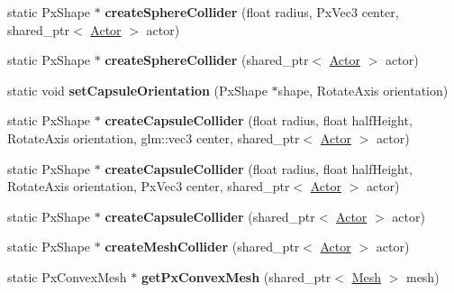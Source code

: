 \begin{DoxyCompactItemize}
\item 
\hypertarget{class_physics_a54b03c18d6a9cef0934ed0e5ba4d1664}{}static Px\+Shape $\ast$ {\bfseries create\+Sphere\+Collider} (float radius, Px\+Vec3 center, shared\+\_\+ptr$<$ \hyperlink{class_actor}{Actor} $>$ actor)\label{class_physics_a54b03c18d6a9cef0934ed0e5ba4d1664}

\item 
\hypertarget{class_physics_a62ed5a7e6561543d40284b1316c9e6f1}{}static Px\+Shape $\ast$ {\bfseries create\+Sphere\+Collider} (shared\+\_\+ptr$<$ \hyperlink{class_actor}{Actor} $>$ actor)\label{class_physics_a62ed5a7e6561543d40284b1316c9e6f1}

\item 
\hypertarget{class_physics_ae1f6e27ae24c88616eac4199329c2474}{}static void {\bfseries set\+Capsule\+Orientation} (Px\+Shape $\ast$shape, Rotate\+Axis orientation)\label{class_physics_ae1f6e27ae24c88616eac4199329c2474}

\item 
\hypertarget{class_physics_af667feaa16f54d7ba980b0535efdd725}{}static Px\+Shape $\ast$ {\bfseries create\+Capsule\+Collider} (float radius, float half\+Height, Rotate\+Axis orientation, glm\+::vec3 center, shared\+\_\+ptr$<$ \hyperlink{class_actor}{Actor} $>$ actor)\label{class_physics_af667feaa16f54d7ba980b0535efdd725}

\item 
\hypertarget{class_physics_ad61bf2c7fdb5b7f6263cb45801d80fa2}{}static Px\+Shape $\ast$ {\bfseries create\+Capsule\+Collider} (float radius, float half\+Height, Rotate\+Axis orientation, Px\+Vec3 center, shared\+\_\+ptr$<$ \hyperlink{class_actor}{Actor} $>$ actor)\label{class_physics_ad61bf2c7fdb5b7f6263cb45801d80fa2}

\item 
\hypertarget{class_physics_ab0918271779efbfbba18a39f7ee9e88a}{}static Px\+Shape $\ast$ {\bfseries create\+Capsule\+Collider} (shared\+\_\+ptr$<$ \hyperlink{class_actor}{Actor} $>$ actor)\label{class_physics_ab0918271779efbfbba18a39f7ee9e88a}

\item 
\hypertarget{class_physics_a2408727ec00753afccccdd949ed45d4e}{}static Px\+Shape $\ast$ {\bfseries create\+Mesh\+Collider} (shared\+\_\+ptr$<$ \hyperlink{class_actor}{Actor} $>$ actor)\label{class_physics_a2408727ec00753afccccdd949ed45d4e}

\item 
\hypertarget{class_physics_a88e2aee7aea3b14821dd1f29061d30d2}{}static Px\+Convex\+Mesh $\ast$ {\bfseries get\+Px\+Convex\+Mesh} (shared\+\_\+ptr$<$ \hyperlink{class_mesh}{Mesh} $>$ mesh)\label{class_physics_a88e2aee7aea3b14821dd1f29061d30d2}


\end{DoxyCompactItemize}
